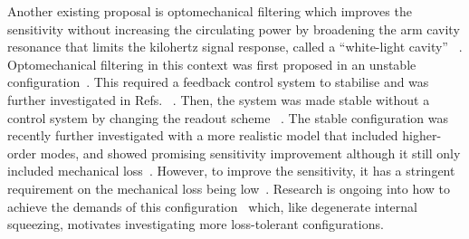 Another existing proposal is optomechanical filtering which improves the sensitivity without increasing the circulating power by broadening the arm cavity resonance that limits the kilohertz signal response, called a ``white-light cavity''~\cite{miaoEnhancingBandwidthGravitationalWave2015,} . Optomechanical filtering in this context was first proposed in an unstable configuration~\cite{miaoEnhancingBandwidthGravitationalWave2015}. 
This required a feedback control system to stabilise and was further investigated in Refs.~\cite{miaoDesignGravitationalWaveDetectors2018,pageEnhancedDetectionHigh2018,} . 
Then, the system was made stable without a control system by changing the readout scheme~\cite{liBroadbandSensitivityImprovement2020} . The stable configuration was recently further investigated with a more realistic model that included higher-order modes, and showed promising sensitivity improvement although it still only included mechanical loss~\cite{liEnhancingInterferometerSensitivity2021}. 
However, to improve the sensitivity, it has a stringent requirement on the mechanical loss being low~\cite{miaoEnhancingBandwidthGravitationalWave2015,liBroadbandSensitivityImprovement2020}. Research is ongoing into how to achieve the demands of this configuration~\cite{opticalSpringRef?,catFlapRef?,}  which, like degenerate internal squeezing, motivates investigating more loss-tolerant configurations. 

